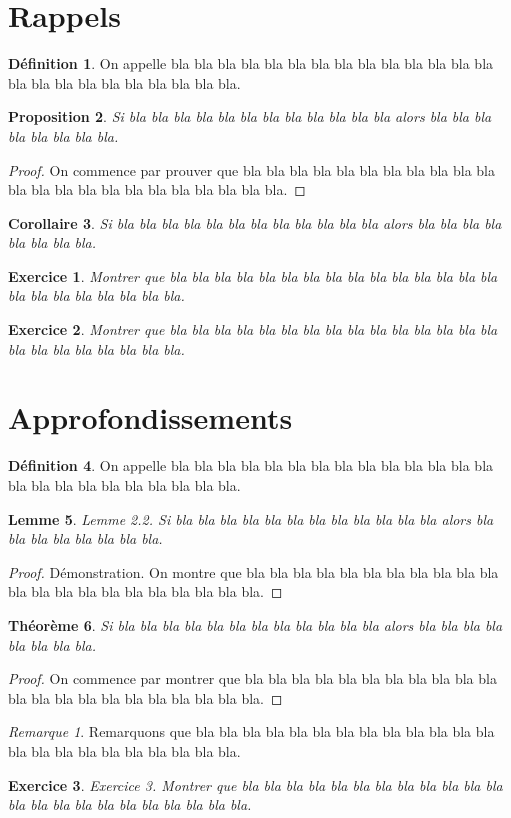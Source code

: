 \documentclass{scrartcl}
\theoremstyle{plain}
\newtheorem{theoreme}{Théorème}[section]
\newtheorem{proposition}[theoreme]{Proposition}
\newtheorem{corollaire}[theoreme]{Corollaire}
\newtheorem{lemme}[theoreme]{Lemme}
\newtheorem{exo}{Exercice}
\theoremstyle{definition}
\newtheorem{definition}[theoreme]{Définition}
\theoremstyle{remark}
\newtheorem*{remarque}{Remarque}
\begin{document}
\section{Rappels}
\begin{definition}
On appelle bla bla bla bla bla bla bla bla bla bla bla bla bla bla bla
bla bla bla bla bla bla bla bla bla.
\end{definition}
\begin{proposition} Si bla bla bla bla bla bla bla bla bla bla bla bla alors bla bla bla bla
bla bla bla bla.
\end{proposition}
\begin{proof}
On commence par prouver que bla bla bla bla bla bla bla bla bla bla
bla bla bla bla bla bla bla bla bla bla bla bla bla.
\end{proof}
\begin{corollaire}
Si bla bla bla bla bla bla bla bla bla bla bla bla alors bla bla bla bla bla
bla bla bla.
\end{corollaire}
\begin{exo}
Montrer que bla bla bla bla bla bla bla bla bla bla bla bla bla bla bla bla
bla bla bla bla bla bla bla.
\end{exo}
\begin{exo}
Montrer que bla bla bla bla bla bla bla bla bla bla bla bla bla bla bla bla
bla bla bla bla bla bla bla.
\end{exo}
\section{Approfondissements}
\begin{definition}
On appelle bla bla bla bla bla bla bla bla bla bla bla bla bla bla bla
bla bla bla bla bla bla bla bla bla.
\end{definition}
\begin{lemme}
Lemme 2.2. Si bla bla bla bla bla bla bla bla bla bla bla bla alors bla bla bla bla bla bla
bla bla.
\end{lemme}
\begin{proof}
Démonstration. On montre que bla bla bla bla bla bla bla bla bla bla bla bla bla bla
bla bla bla bla bla bla bla bla.
\end{proof}
\begin{theoreme}
 Si bla bla bla bla bla bla bla bla bla bla bla bla alors bla bla bla bla bla
bla bla bla.
\end{theoreme}
\begin{proof}
On commence par montrer que bla bla bla bla bla bla bla bla bla bla
bla bla bla bla bla bla bla bla bla bla bla bla.
\end{proof}
\begin{remarque}
 Remarquons que bla bla bla bla bla bla bla bla bla bla bla bla bla bla bla
bla bla bla bla bla bla bla bla.
\end{remarque}
\begin{exo}
Exercice 3. Montrer que bla bla bla bla bla bla bla bla bla bla bla bla bla bla bla bla
bla bla bla bla bla bla bla.
\end{exo}
\end{document}
